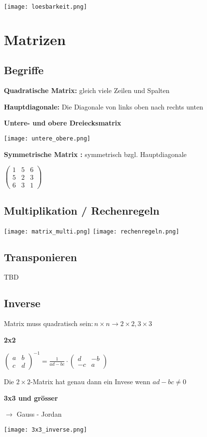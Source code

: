 \begin{multicols*}{3}
 \texttt{[image: loesbarkeit.png]}

\section{Matrizen}
\subsection{Begriffe}

\textbf{Quadratische Matrix:} gleich viele Zeilen und Spalten  

\textbf{Hauptdiagonale:} Die Diagonale von links oben nach rechts unten  

\textbf{Untere- und obere Dreiecksmatrix}  

\texttt{[image: untere\_obere.png]} 

\textbf{Symmetrische Matrix :} symmetrisch bzgl. Hauptdiagonale 

$ \begin{pmatrix}
1 & 5 & 6\\
5 & 2 & 3\\
6 & 3 & 1
\end{pmatrix} $

\WhiteSpace
\subsection{Multiplikation / Rechenregeln}
{\begin{multicols}{2}
{ \texttt{[image: matrix\_multi.png]} }
\columnbreak
{ \texttt{[image: rechenregeln.png]} }
\end{multicols}}

\subsection{Transponieren}

TBD

\subsection{Inverse}
{Matrix muss quadratisch sein$: n \times n \rightarrow 2\times2, 3\times3$} 

\textbf{2x2} 

{\large$\begin{pmatrix}
a & b\\
c & d
\end{pmatrix}^{-1} = \frac{1}{ad-bc}\cdot\begin{pmatrix}
d & -b\\
-c & a
\end{pmatrix}$}

{Die $2\times2$-Matrix hat genau dann ein Invese wenn $ad-bc \neq 0$}

\textbf{3x3 und grösser}

{$\rightarrow$ Gauss - Jordan}

 \texttt{[image: 3x3\_inverse.png]} 
\WhiteSpace

\mbox{}
	
\end{multicols*} 


